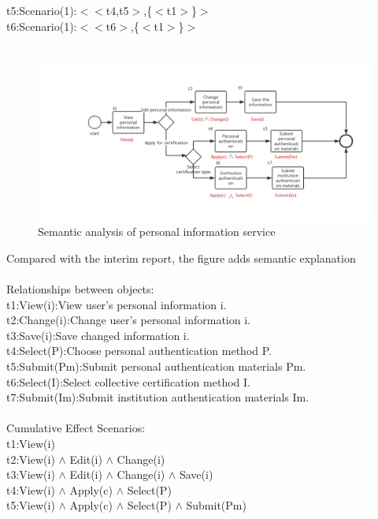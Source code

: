 \documentclass[runningheads]{llncs}
\begin{document}
t5:Scenario(1):$<$$<$t4,t5$>$,\{$<$t1$>$\}$>$\\
t6:Scenario(1):$<$$<$t6$>$,\{$<$t1$>$\}$>$\\
\\
\begin{figure}[H]
		\centering %
		\includegraphics[width=1.0\textwidth]{./figure/Hyy/gg} %
		\caption{Semantic analysis of personal information service} %
		\label{study} %
	\end{figure}
Compared with the interim report, the figure adds semantic explanation\\
\\
Relationships between objects:\\
t1:View(i):View user’s personal information i.\\
t2:Change(i):Change user’s personal information i.\\
t3:Save(i):Save changed information i.\\
t4:Select(P):Choose personal authentication method P.\\
t5:Submit(Pm):Submit personal authentication materials Pm.\\
t6:Select(I):Select collective certification method I.\\
t7:Submit(Im):Submit institution authentication materials Im.\\
\\
Cumulative Effect Scenarios:\\
t1:View(i)\\
t2:View(i) $\wedge$ Edit(i) $\wedge$ Change(i)\\
t3:View(i) $\wedge$ Edit(i) $\wedge$ Change(i) $\wedge$ Save(i)\\
t4:View(i) $\wedge$ Apply(c) $\wedge$ Select(P)\\
t5:View(i) $\wedge$ Apply(c) $\wedge$ Select(P) $\wedge$ Submit(Pm)\\
\end{document}
